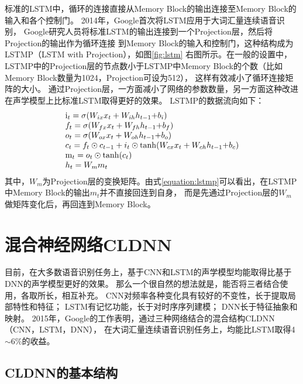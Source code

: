 标准的LSTM中，循环的连接直接从Memory Block的输出连接至Memory Block的输入和各个控制门。
2014年，Google首次将LSTM应用于大词汇量连续语音识别，
Google研究人员将标准LSTM的输出连接到一个Projection层，然后将Projection的输出作为循环连接
到Memory Block的输入和控制门，这种结构成为LSTMP（LSTM with Projection），如图\ref{fig:lstm}
右图所示。在一般的设置中，LSTMP中的Projection层的节点数小于LSTMP中Memory Block的个数（比如Memory Block数量为1024，Projection可设为512），
这样有效减小了循环连接矩阵的大小。
通过Projection层，一方面减小了网络的参数数量，另一方面这种改进在声学模型上比标准LSTM取得更好的效果。
LSTMP的数据流向如下：
\begin{equation}
\label{equation:lstmp}
\begin{array}{l}
{{\rm{i}}_t} = \sigma ({W_{ix}}{x_t} + {W_{ih}}{h_{t - 1}}{\rm{ + }}{b_i})\\
{f_t} = \sigma ({W_{fx}}{x_t} + {W_{fh}}{h_{t - 1}}{\rm{ + }}{b_f})\\
{o_t} = \sigma ({W_{ox}}{x_t} + {W_{oh}}{h_{t - 1}}{\rm{ + }}{b_o})\\
{c_t} = {f_t} \odot {c_{t - 1}} + {i_t} \odot \tanh ({W_{cx}}{x_t} + {W_{ch}}{h_{t - 1}}{\rm{ + }}{b_c})\\
{{\rm{m}}_t} = {o_t} \odot \tanh ({c_t})\\
{h_t} = {W_m}{m_t}
\end{array}
\end{equation}
其中，$W_m$为Projection层的变换矩阵。由式\ref{equation:lstmp}可以看出，在LSTMP中Memory Block的输出$m_t$并不直接回连到自身，
而是先通过Projection层的$W_m$做矩阵变化后，再回连到Memory Block。

\section{混合神经网络CLDNN}

目前，在大多数语音识别任务上，基于CNN和LSTM的声学模型均能取得比基于DNN的声学模型更好的效果。
那么一个很自然的想法就是，能否将三者结合使用，各取所长，相互补充。
CNN对频率各种变化具有较好的不变性，长于提取局部特性和特征；
LSTM有记忆功能，长于对时序序列建模；
DNN长于特征抽象和映射。
2015年，Google的工作表明，通过三种网络结合的混合结构CLDNN（CNN，LSTM，DNN），
在大词汇量连续语音识别任务上，均能比LSTM取得4$\sim$6\%的收益。

\subsection{CLDNN的基本结构}

